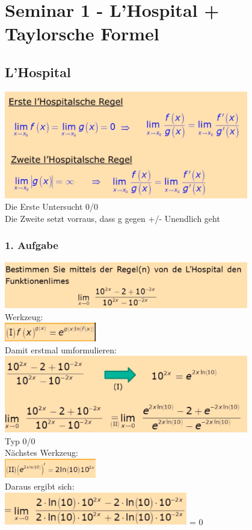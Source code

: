 \documentclass[12pt,a4paper]{article}
\begin{document}
\section{Seminar 1 - L'Hospital + Taylorsche Formel}
\subsection{L'Hospital}
\includegraphics[width=0.8\textwidth]{Bilder/S1/1.png}\\
Die Erste Untersucht 0/0\\
Die Zweite setzt vorraus, dass g gegen +/- Unendlich geht\\
\subsubsection{1. Aufgabe}
\includegraphics[width=0.8\textwidth]{Bilder/S1/2.png}\\
Werkzeug:\\
\includegraphics[width=0.3\textwidth]{Bilder/S1/3.png}\\
Damit erstmal umformulieren:\\
\includegraphics[width=0.8\textwidth]{Bilder/S1/4.png}\\
Typ 0/0\\
\newpage
Nächstes Werkzeug:\\
\includegraphics[width=0.3\textwidth]{Bilder/S1/5.png}\\
Daraus ergibt sich:\\
\includegraphics[width=0.6\textwidth]{Bilder/S1/6.png} = 0\\
\end{document}
